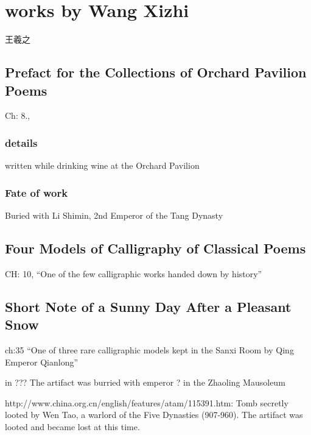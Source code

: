 \chapter{works by Wang Xizhi}

王羲之

\section{Prefact for the Collections of Orchard Pavilion Poems}

Ch: 8.,

\subsection{details}

written while drinking wine at the Orchard Pavilion

\subsection{Fate of work}

Buried with Li Shimin, 2nd Emperor of the Tang Dynasty

\section{Four Models of Calligraphy of Classical Poems}

CH: 10, ``One of the few calligraphic works handed down by history''

\section{Short Note of a Sunny Day After a Pleasant Snow}

ch:35 ``One of three rare calligraphic models kept in the Sanxi Room by Qing Emperor Qianlong''

in ??? The artifact was burried with emperor ? in the Zhaoling Mausoleum

http://www.china.org.cn/english/features/atam/115391.htm:  Tomb secretly looted by Wen Tao, a warlord of the Five Dynasties (907-960).  The artifact was looted and became lost at this time.





